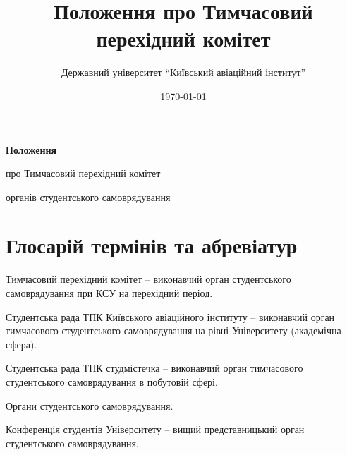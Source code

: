 \documentclass[12pt, a4paper]{article}
\title{Положення про Тимчасовий перехідний комітет}
\author{Державний університет ``Київський авіаційний інститут''}
\date{\today}
\begin{document}
\begin{titlepage}
    \centering
    \vspace*{\fill}

    {\Huge\bfseries Положення}\par
    \vspace{1em}
    {\LARGE про Тимчасовий перехідний комітет}\par
    \vspace{0.5em}
    {\large органів студентського самоврядування}\par

    \vspace*{\fill}
\end{titlepage}

\section*{Глосарій термінів та абревіатур}
\begin{description}[leftmargin=3.5cm,style=nextline]
    \item[ТПК] Тимчасовий перехідний комітет -- виконавчий орган студентського самоврядування при КСУ на перехідний період.
    \item[СР ТПК КАІ] Студентська рада ТПК Київського авіаційного інституту -- виконавчий орган тимчасового студентського самоврядування на рівні Університету (академічна сфера).
    \item[СР ТПК СМ] Студентська рада ТПК студмістечка -- виконавчий орган тимчасового студентського самоврядування в побутовій сфері.
    \item[ОСС] Органи студентського самоврядування.
    \item[КСУ] Конференція студентів Університету -- вищий представницький орган студентського самоврядування.
\end{description}
\newpage

\renewcommand{\contentsname}{Зміст}
\tableofcontents
\newpage










\end{document}
